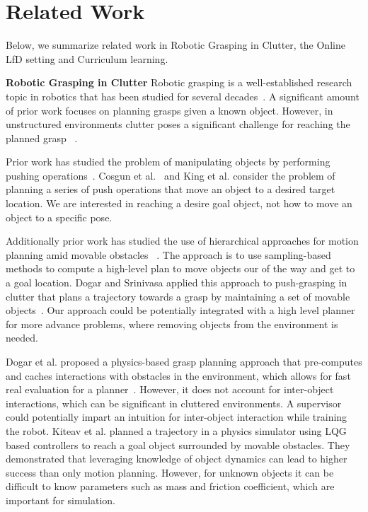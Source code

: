 \documentclass[10pt, conference]{ieeeconf}      %
\begin{document}
\section{Related Work}
Below, we summarize related work in Robotic Grasping in Clutter, the Online LfD setting and Curriculum learning.

\noindent \textbf{Robotic Grasping in Clutter}
Robotic grasping is a well-established research topic in robotics that has been studied for several
decades~\cite{bicchi2000robotic}. A significant amount of prior work focuses on planning grasps given a known object.
However, in unstructured environments clutter poses a significant challenge for reaching the planned grasp
~\cite{katz2008can}. 


Prior work has studied the problem of manipulating objects
by performing pushing operations~\cite{mason1986mechanics}.  Cosgun et al.~\cite{cosgun2011push} and King et al. \cite{kingnonprehensile} consider the problem of planning a series of push operations that move an object to a
desired target location. We are interested in reaching a desire goal object, not how to move an object to a specific pose.

Additionally prior work has studied the use of hierarchical approaches for motion planning amid movable obstacles ~\cite{stilman2007manipulation,van2009path}. The approach is to use sampling-based methods to compute a high-level plan to move objects our of the way and get to a goal location. Dogar and Srinivasa applied this approach to push-grasping in clutter that plans a trajectory towards a grasp by maintaining a set of movable objects~\cite{dogar2011framework}. Our approach could be potentially integrated with a high level planner for more advance problems, where removing objects from the environment is needed. 

Dogar et al. proposed a physics-based grasp planning approach that pre-computes and caches interactions with obstacles in the environment, which allows for fast real evaluation for a planner~\cite{dogar2012physics}. However, it does not account for inter-object interactions, which can be significant in cluttered environments. A supervisor could potentially impart an intuition for inter-object interaction while training the robot. Kiteav et al. planned a trajectory in a physics simulator using LQG based controllers
\cite{kitaevphysics} to reach a goal object surrounded by movable obstacles. They demonstrated that leveraging knowledge of object dynamics can lead to higher success than only motion planning.  However, for unknown objects it can be difficult to know parameters such as mass and friction coefficient, which are important for simulation. 
\end{document}
